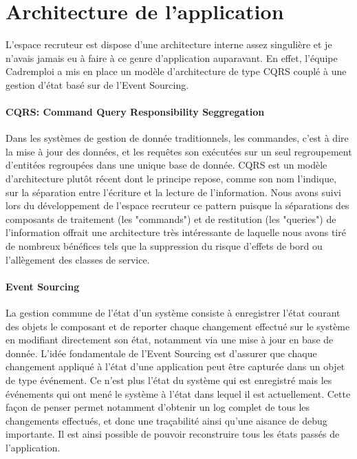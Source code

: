 \section{Architecture de l'application}
\label{sec:Architecture de l'application}
L'espace recruteur est dispose d'une architecture interne assez singulière et je n'avais jamais eu à faire à ce genre d'application auparavant.
En effet, l'équipe Cadremploi a mis en place un modèle d'architecture de type CQRS couplé à une gestion d'état basé sur de l'Event Sourcing.
\paragraph{CQRS: Command Query Responsibility Seggregation}
\label{par:CQRS: Command Query Responsibility Seggregation}
Dans les systèmes de gestion de donnée traditionnels, les commandes, c'est à dire la mise à jour des données, et les requêtes son exécutées sur un seul regroupement d'entitées regroupées dans une unique base de donnée.
CQRS est un modèle d'architecture plutôt récent dont le principe repose, comme son nom l'indique, sur la séparation entre l'écriture et la lecture de l'information.
Nous avons suivi lors du développement de l'espace recruteur ce pattern puisque la séparations des composants de traitement (les "commands") et de restitution (les "queries") de l'information offrait une architecture très intéressante de laquelle nous avons tiré de nombreux bénéfices tels que la suppression du risque d'effets de bord ou l'allègement des classes de service.
\paragraph{Event Sourcing}
\label{par:Event Sourcing}
La gestion commune de l'état d'un système consiste à enregistrer l'état courant des objets le composant et de reporter chaque changement effectué sur le système en modifiant directement son état, notamment via une mise à jour en base de donnée.
L'idée fondamentale de l'Event Sourcing est d'assurer que chaque changement appliqué à l'état d'une application peut être capturée dans un objet de type événement.
Ce n'est plus l'état du système qui est enregistré mais les événements qui ont mené le système à l'état dans lequel il est actuellement.
Cette façon de penser permet notamment d'obtenir un log complet de tous les changements effectués, et donc une traçabilité ainsi qu'une aisance de debug importante.
Il est ainsi possible de pouvoir reconstruire tous les états passés de l'application.
